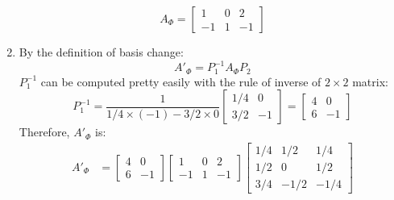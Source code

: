 \documentclass[12pt]{article}
\begin{document}
\begin{enumerate}[label=\alph*.]
\begin{equation*}
                        A_\Phi = \left[\begin{matrix}
                             1 & 0 &  2\\
                            -1 & 1 & -1
                        \end{matrix}\right]
                    \end{equation*}
                \item By the definition of basis change:
                    \begin{equation*}
                        A'_\Phi = P_1^{-1} A_\Phi P_2
                    \end{equation*}
                    $P_1^{-1}$ can be computed pretty easily with the rule of inverse of $2\times 2$ matrix:
                    \begin{equation*}
                        P_1^{-1} = \frac{1}{1/4 \times (-1) - 3/2 \times 0}\left[\begin{matrix}
                            1/4 & 0\\
                            3/2 & -1
                        \end{matrix}\right]
                        = \left[\begin{matrix}
                            4 & 0\\
                            6 & -1
                        \end{matrix}\right]
                    \end{equation*}
                    Therefore, $A'_\Phi$ is:
                    \begin{align*}
                        A'_\Phi &= \left[\begin{matrix}
                            4 & 0\\
                            6 & -1
                        \end{matrix}\right] \left[\begin{matrix}
                            1 & 0 & 2\\
                            -1 & 1 & -1
                        \end{matrix}\right] \left[\begin{matrix}
                            1/4 & 1/2  & 1/4\\
                            1/2 & 0    & 1/2\\
                            3/4 & -1/2 & -1/4
                        \end{matrix}\right]\\

\end{align*}
\end{enumerate}
\end{document}
